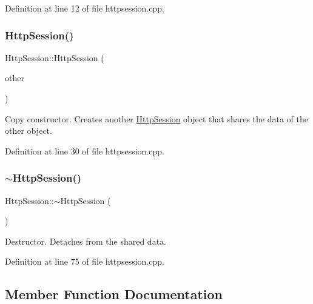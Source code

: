 Definition at line 12 of file httpsession.\+cpp.

\mbox{\label{classstefanfrings_1_1_http_session_a019a110a75a3abdba2ad456848e989a2}} 
\subsubsection{\texorpdfstring{Http\+Session()}{HttpSession()}\hspace{0.1cm}{\footnotesize\ttfamily [2/2]}}
{\footnotesize\ttfamily Http\+Session\+::\+Http\+Session (\begin{DoxyParamCaption}\item[{const \mbox{\hyperlink{classstefanfrings_1_1_http_session}{Http\+Session}} \&}]{other }\end{DoxyParamCaption})}

Copy constructor. Creates another \mbox{\hyperlink{classstefanfrings_1_1_http_session}{Http\+Session}} object that shares the data of the other object. 

Definition at line 30 of file httpsession.\+cpp.

\mbox{\label{classstefanfrings_1_1_http_session_afb9e986ea06dc1cb767d3d6fbf6f420c}} 
\subsubsection{\texorpdfstring{$\sim$\+Http\+Session()}{~HttpSession()}}
{\footnotesize\ttfamily Http\+Session\+::$\sim$\+Http\+Session (\begin{DoxyParamCaption}{ }\end{DoxyParamCaption})\hspace{0.3cm}{\ttfamily [virtual]}}

Destructor. Detaches from the shared data. 

Definition at line 75 of file httpsession.\+cpp.



\subsection{Member Function Documentation}
\mbox{\label{classstefanfrings_1_1_http_session_a5941c26024d0f026ae11668321353f70}} 
